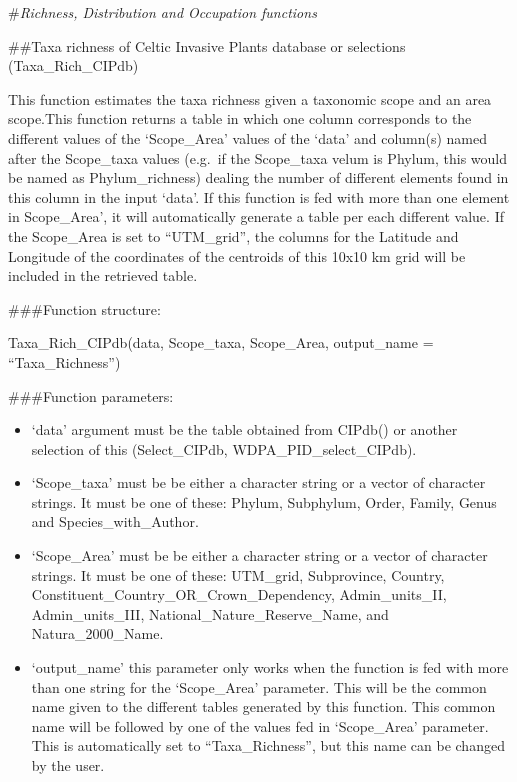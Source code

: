 \documentclass[
]{article}
\providecommand{\tightlist}{%
  \setlength{\itemsep}{0pt}\setlength{\parskip}{0pt}}
\begin{document}
\#\emph{Richness, Distribution and Occupation functions}

\#\#Taxa richness of Celtic Invasive Plants database or selections
(Taxa\_Rich\_CIPdb)

This function estimates the taxa richness given a taxonomic scope and an
area scope.This function returns a table in which one column corresponds
to the different values of the `Scope\_Area' values of the `data' and
column(s) named after the Scope\_taxa values (e.g.~if the Scope\_taxa
velum is Phylum, this would be named as Phylum\_richness) dealing the
number of different elements found in this column in the input `data'.
If this function is fed with more than one element in Scope\_Area', it
will automatically generate a table per each different value. If the
Scope\_Area is set to ``UTM\_grid'', the columns for the Latitude and
Longitude of the coordinates of the centroids of this 10x10 km grid will
be included in the retrieved table.

\#\#\#Function structure:

Taxa\_Rich\_CIPdb(data, Scope\_taxa, Scope\_Area, output\_name =
``Taxa\_Richness'')

\#\#\#Function parameters:

\begin{itemize}
\tightlist
\item
  `data' argument must be the table obtained from CIPdb() or another
  selection of this (Select\_CIPdb, WDPA\_PID\_select\_CIPdb).
\item
  `Scope\_taxa' must be be either a character string or a vector of
  character strings. It must be one of these: Phylum, Subphylum, Order,
  Family, Genus and Species\_with\_Author.
\item
  `Scope\_Area' must be be either a character string or a vector of
  character strings. It must be one of these: UTM\_grid, Subprovince,
  Country, Constituent\_Country\_OR\_Crown\_Dependency,
  Admin\_units\_II, Admin\_units\_III, National\_Nature\_Reserve\_Name,
  and Natura\_2000\_Name.
\item
  `output\_name' this parameter only works when the function is fed with
  more than one string for the `Scope\_Area' parameter. This will be the
  common name given to the different tables generated by this function.
  This common name will be followed by one of the values fed in
  `Scope\_Area' parameter. This is automatically set to
  ``Taxa\_Richness'', but this name can be changed by the user.
\end{itemize}
\end{document}
